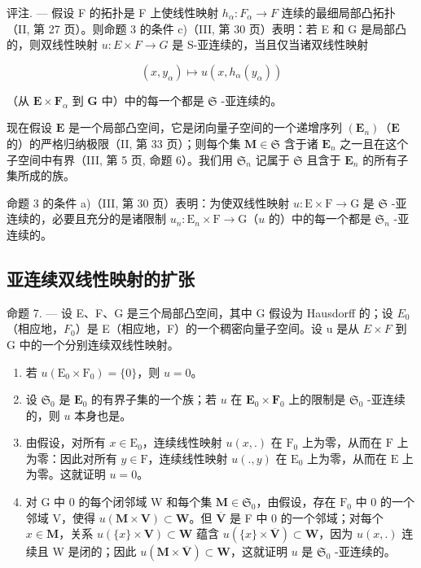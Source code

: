 评注. --- 假设 F 的拓扑是 F 上使线性映射 \(h_{\alpha}:F_{\alpha}\to F\) 连续的最细局部凸拓扑（II, 第 27 页）。则命题 3 的条件 c)（III, 第 30 页）表明：若 E 和 G 是局部凸的，则双线性映射 \(u:E\times F\to G\) 是 S-亚连续的，当且仅当诸双线性映射

\[
(x, y _ {\alpha}) \mapsto u (x, h _ {\alpha} (y _ {\alpha}))
\]

（从 \(\mathbf{E} \times \mathbf{F}_{\alpha}\) 到 \(\mathbf{G}\) 中）中的每一个都是 \(\mathfrak{S}\) -亚连续的。

现在假设 \(\mathbf{E}\) 是一个局部凸空间，它是闭向量子空间的一个递增序列 \((\mathbf{E}_n)\)（\(\mathbf{E}\) 的）的严格归纳极限（II, 第 33 页）；则每个集 \(\mathbf{M} \in \mathfrak{S}\) 含于诸 \(\mathbf{E}_n\) 之一且在这个子空间中有界（III, 第 5 页, 命题 6）。我们用 \(\mathfrak{S}_n\) 记属于 \(\mathfrak{S}\) 且含于 \(\mathbf{E}_n\) 的所有子集所成的族。

命题 3 的条件 a)（III, 第 30 页）表明：为使双线性映射 \(u: \mathrm{E} \times \mathrm{F} \to \mathrm{G}\) 是 \(\mathfrak{S}\) -亚连续的，必要且充分的是诸限制 \(u_n: \mathrm{E}_n \times \mathrm{F} \to \mathrm{G}\)（\(u\) 的）中的每一个都是 \(\mathfrak{S}_n\) -亚连续的。

\subsection{亚连续双线性映射的扩张}

命题 7. --- 设 E、F、G 是三个局部凸空间，其中 G 假设为 Hausdorff 的；设 \(E_{0}\)（相应地，\(F_{0}\)）是 E（相应地，F）的一个稠密向量子空间。设 u 是从 \(E \times F\) 到 G 中的一个分别连续双线性映射。

\begin{enumerate}
\def\labelenumi{\arabic{enumi})}
\item
  若 \(u(\mathrm{E}_0 \times \mathrm{F}_0) = \{0\}\)，则 \(u = 0\)。
\item
  设 \(\mathfrak{S}_0\) 是 \(\mathbf{E}_0\) 的有界子集的一个族；若 \(u\) 在 \(\mathbf{E}_0 \times \mathbf{F}_0\) 上的限制是 \(\mathfrak{S}_0\) -亚连续的，则 \(u\) 本身也是。
\item
  由假设，对所有 \(x \in \mathrm{E}_0\)，连续线性映射 \(u(x, .)\) 在 \(\mathrm{F}_0\) 上为零，从而在 \(\mathrm{F}\) 上为零：因此对所有 \(y \in \mathrm{F}\)，连续线性映射 \(u(., y)\) 在 \(\mathrm{E}_0\) 上为零，从而在 \(\mathrm{E}\) 上为零。这就证明 \(u = 0\)。
\item
  对 G 中 0 的每个闭邻域 W 和每个集 \(\mathbf{M} \in \mathfrak{S}_0\)，由假设，存在 \(\mathrm{F}_0\) 中 0 的一个邻域 V，使得 \(u(\mathbf{M} \times \mathbf{V}) \subset \mathbf{W}\)。但 \(\overline{\mathbf{V}}\) 是 F 中 0 的一个邻域；对每个 \(x \in \mathbf{M}\)，关系 \(u(\{x\} \times \mathbf{V}) \subset \mathbf{W}\) 蕴含 \(u(\{x\} \times \overline{\mathbf{V}}) \subset \mathbf{W}\)，因为 \(u(x, .)\) 连续且 W 是闭的；因此 \(u(\mathbf{M} \times \overline{\mathbf{V}}) \subset \mathbf{W}\)，这就证明 \(u\) 是 \(\mathfrak{S}_0\) -亚连续的。
\end{enumerate}

